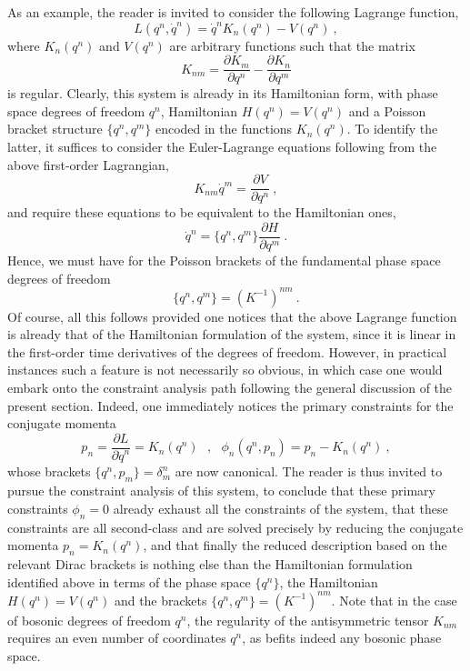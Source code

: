 \documentclass[a4paper,11pt]{article}
\begin{document}
As an example, the reader is invited to consider the following Lagrange
function,
\begin{equation}
L(q^n,\dot{q}^n)=\dot{q}^nK_n(q^n)-V(q^n)\ ,
\end{equation}
where $K_n(q^n)$ and $V(q^n)$ are arbitrary functions such that the
matrix
\begin{equation}K_{nm}=
\frac{\partial K_m}{\partial q^n}-\frac{\partial K_n}{\partial q^m}
\end{equation}
is regular. Clearly, this system is already in its Hamiltonian 
form,\cite{JG1,FJ}
with phase space degrees of freedom $q^n$, Hamiltonian $H(q^n)=V(q^n)$ and
a Poisson bracket structure $\{q^n,q^m\}$ encoded in the functions 
$K_n(q^n)$. To identify the latter, it suffices to consider the Euler-Lagrange 
equations following from the above first-order Lagrangian,
\begin{equation}
K_{nm}\dot{q}^m=\frac{\partial V}{\partial q^n}\ ,
\end{equation}
and require these equations to be equivalent to the Hamiltonian ones,
\begin{equation}
\dot{q}^n=\{q^n,q^m\}\frac{\partial H}{\partial q^m}\ .
\end{equation}
Hence, we must have for the Poisson brackets of the fundamental phase space
degrees of freedom
\begin{equation}
\{q^n,q^m\}=\left(K^{-1}\right)^{nm}\ .
\end{equation}
Of course, all this follows provided one notices that the above Lagrange
function is already that of the Hamiltonian formulation of the system,
since it is linear in the first-order time derivatives of the degrees of
freedom. However, in practical instances such a feature is not necessarily
so obvious, in which case one would embark onto the constraint analysis
path following the ge\-ne\-ral discussion of the present section. Indeed, one
immediately notices the primary constraints for the conjugate momenta
\begin{equation}
p_n=\frac{\partial L}{\partial\dot{q}^n}=K_n(q^n)\ \ \ ,\ \ \ 
\phi_n(q^n,p_n)=p_n-K_n(q^n)\ ,
\end{equation}
whose brackets $\{q^n,p_m\}=\delta^n_m$ are now canonical. The reader
is thus invited to pursue the constraint analysis of this system, to
conclude that these primary constraints $\phi_n=0$ already exhaust all
the constraints of the system, that these constraints are all second-class
and are solved precisely by reducing the conjugate momenta $p_n=K_n(q^n)$, 
and that finally the reduced description based on the relevant Dirac brackets 
is nothing else than the Hamiltonian formulation identified above in terms of
the phase space $\{q^n\}$, the Hamiltonian $H(q^n)=V(q^n)$ and the
brackets $\{q^n,q^m\}=(K^{-1})^{nm}$. Note that in the case of bosonic degrees
of freedom $q^n$, the regularity of the antisymmetric tensor $K_{nm}$
requires an even number of coordinates $q^n$, as befits indeed any bosonic
phase space.
\end{document}
